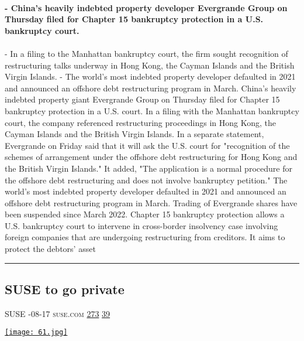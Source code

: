 \documentclass[10pt,a4paper]{article}
\begin{document}
\begin{multicols}{2}
\paragraph{}
\textbf{- China's heavily indebted property developer Evergrande Group on Thursday filed for Chapter 15 bankruptcy protection in a U.S. bankruptcy court.}
\paragraph{}

- In a filing to the Manhattan bankruptcy court, the firm sought recognition of restructuring talks underway in Hong Kong, the Cayman Islands and the British Virgin Islands.
- The world's most indebted property developer defaulted in 2021 and announced an offshore debt restructuring program in March.
China's heavily indebted property giant Evergrande Group on Thursday filed for Chapter 15 bankruptcy protection in a U.S. court.
In a filing with the Manhattan bankruptcy court, the company referenced restructuring proceedings in Hong Kong, the Cayman Islands and the British Virgin Islands.
In a separate statement, Evergrande on Friday said that it will ask the U.S. court for "recognition of the schemes of arrangement under the offshore debt restructuring for Hong Kong and the British Virgin Islands."
It added, "The application is a normal procedure for the offshore debt restructuring and does not involve bankruptcy petition."
The world's most indebted property developer defaulted in 2021 and announced an offshore debt restructuring program in March. Trading of Evergrande shares have been suspended since March 2022.
Chapter 15 bankruptcy protection allows a U.S. bankruptcy court to intervene in cross-border insolvency case involving foreign companies that are undergoing restructuring from creditors. It aims to protect the debtors' asset
\par\noindent\textcolor{red}{\rule{\linewidth}{0.2mm}}
\vfill
\null
\noindent\begin{minipage}{\linewidth}
\subsection{SUSE to go private}
\textsc{\footnotesize
{\scriptsize\faUser}\space 
SUSE 
{\scriptsize\faCalendar}-08-17 
{\scriptsize\faGlobe}\space 
suse.com 
{\scriptsize\faThumbsOUp}\space 
\href{http://news.ycombinator.com/item?id=37166885\&utm\_term=comment}{273} 
{\scriptsize\faComments}\space 
\href{http://news.ycombinator.com/item?id=37166885\&utm\_term=comment}{39} 
}
\par\medskip\noindent
\href{https://www.suse.com/news/EQT-announces-voluntary-public-purchase-offer-and-intention-to-delist-SUSE/?utm\_source=hackernewsletter\&utm\_medium=email\&utm\_term=startup\_news}{
    \texttt{[image: 61.jpg]}
}
\end{minipage}

\end{multicols}
\end{document}
